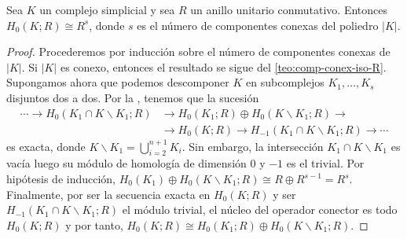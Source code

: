 \begin{corolario}
	Sea \(K\) un complejo simplicial y sea \(R\) un anillo unitario conmutativo. Entonces \(H_0(K; R) \cong R^s\), donde \(s\) es el número de componentes conexas del poliedro \(|K|\).
\end{corolario}
\begin{proof}
	Procederemos por inducción sobre el número de componentes conexas de \(|K|\). Si \(|K|\) es conexo, entonces el resultado se sigue del \autoref{teo:comp-conex-iso-R}. Supongamos ahora que podemos descomponer \(K\) en subcomplejos \(K_1, \ldots, K_{s}\) disjuntos dos a dos. Por la , tenemos que la sucesión
	\begin{align}
	\cdots \to H_{0}\left(K_{1}\cap K \backslash K_1;R\right) &\to  H_{0}(K_{1};R) \oplus H_0\left( K \backslash K_1;R\right) \to \\ &\to H_{0}(K;R) \to H_{-1}\left(K_{1}\cap K \backslash K_1;R\right) \to \cdots
	\end{align}
	es exacta, donde \(K \backslash K_1 = \bigcup_{i=2}^{n+1} K_{i}\). Sin embargo, la intersección \(K_{1}\cap K \backslash K_1\) es vacía luego su módulo de homología de dimensión \(0\) y \(-1\) es el trivial. Por hipótesis de inducción, \( H_0(K_1) \oplus H_0(K \backslash K_1;R) \cong R \oplus R^{s-1} = R^s\). Finalmente, por ser la secuencia exacta en \(H_0(K;R)\) y ser \(H_{-1}\left(K_{1}\cap K \backslash K_1;R\right)\) el módulo trivial, el núcleo del operador conector es todo \(H_0(K;R)\) y por tanto, \(H_0(K;R) \cong H_{0}(K_{1};R) \oplus H_0\left( K \backslash K_1;R\right)\).
\end{proof}

